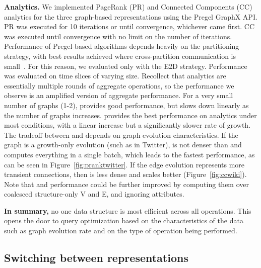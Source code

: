 {\bf Analytics.}  We implemented PageRank (PR) and Connected
Components (CC) analytics for the three graph-based representations
using the Pregel GraphX API.  PR was executed for 10 iterations or
until convergence, whichever came first. CC was executed until
convergence with no limit on the number of iterations.  Performance of
Pregel-based algorithms depends heavily on the partitioning strategy,
with best results achieved where cross-partition communication is
small~\cite{MoffittTempWeb16}.  For this reason, we evaluated only
with the E2D strategy.
%
Performance was evaluated on time slices of varying size.  Recollect
that analytics are essentially multiple rounds of aggregate
operations, so the performance we observe is an amplified version of
aggregate performance.  For a very small number of graphs (1-2), \sg
provides good performance, but slows down linearly as the number of
graphs increases.  \hg provides the best performance on analytics
under most conditions, with a linear increase but a significantly
slower rate of growth.  The tradeoff between \og and \hg depends on
graph evolution characteristics.  If the graph is a growth-only
evolution (such as in Twitter), \og is not denser than \hg and
computes everything in a single batch, which leads to the fastest
performance, as can be seen in Figure~\ref{fig:pranktwitter}.  If the
edge evolution represents more transient connections, then \hg is less
dense and scales better (Figure~\ref{fig:ccwiki}).  Note that \og and
\hg performance could be further improved by computing them over
coalesced structure-only V and E, and ignoring attributes.

{\bf In summary,} no one data structure is most efficient across all
operations.  This opens the door to query optimization based on the
characteristics of the data such as graph evolution rate and on the
type of operation being performed.  


\subsection{Switching between representations}
\label{sec:exp:scale}

